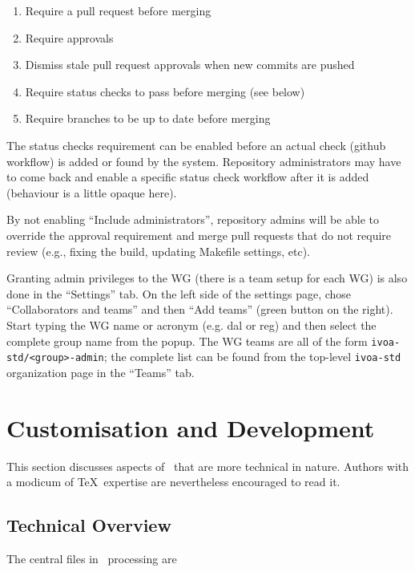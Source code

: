 \documentclass[11pt,a4paper]{ivoa}
\begin{document}
\begin{enumerate}
\item Require a pull request before merging
\item Require approvals
\item Dismiss stale pull request approvals when new commits are pushed
\item Require status checks to pass before merging (see below)
\item Require branches to be up to date before merging
\end{enumerate}

The status checks requirement can be enabled before an actual check (github workflow) is
added or found by the system. Repository administrators may have to come back and enable a
specific status check workflow after it is added (behaviour is a little opaque here).

By not enabling ``Include administrators'', repository admins will be able to override the
approval requirement and merge pull requests that do not require review (e.g., fixing the build,
updating Makefile settings, etc).

Granting admin privileges to the WG (there is a team setup for each WG) is also done in the
``Settings'' tab. On the left side of the settings page, chose ``Collaborators and teams''
and then ``Add teams'' (green button on the right). Start typing the WG name or acronym (e.g.
dal or reg) and then select the complete group name from the popup. The WG teams are all
of the form \verb|ivoa-std/<group>-admin|; the complete list can be found from the top-level
\verb|ivoa-std| organization page in the ``Teams'' tab.

\section{Customisation and Development}
\label{sect:impl}

This section discusses aspects of \ivoatex\ that are more technical in
nature.  Authors with a modicum of \TeX\ expertise are nevertheless
encouraged to read it.

\subsection{Technical Overview}

The central files in \ivoatex\ processing are
\end{document}
